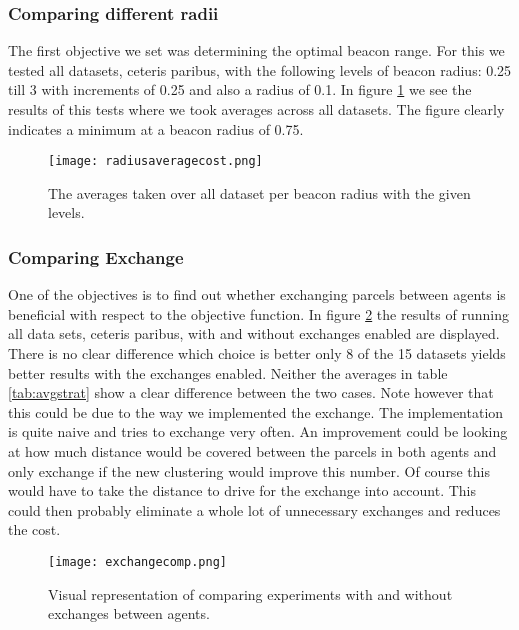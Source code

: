 \documentclass[../main.tex]{subfiles}
\begin{document}
\subsubsection{Comparing different radii}
The first objective we set was determining the optimal beacon range.
For this we tested all datasets, ceteris paribus, with the following levels of beacon radius: 0.25 till 3 with increments of 0.25 and also a radius of 0.1.
In figure \ref{fig:rad} we see the results of this tests where we took averages across all datasets.
The figure clearly indicates a minimum at a beacon radius of 0.75.
\begin{figure}
	\centering
	\texttt{[image: radiusaveragecost.png]}
	\caption{The averages taken over all dataset per beacon radius with the given levels.}
	\label{fig:rad}
\end{figure}

\subsubsection{Comparing Exchange}
One of the objectives is to find out whether exchanging parcels between agents is beneficial with respect to the objective function.
In figure \ref{fig:exch} the results of running all data sets, ceteris paribus, with and without exchanges enabled are displayed.
There is no clear difference which choice is better only 8 of the 15 datasets yields better results with the exchanges enabled.
Neither the averages in table \ref{tab:avgstrat} show a clear difference between the two cases.
Note however that this could be due to the way we implemented the exchange.
The implementation is quite naive and tries to exchange very often.
An improvement could be looking at how much distance would be covered between the parcels in both agents and only exchange if the new clustering would improve this number.
Of course this would have to take the distance to drive for the exchange into account.
This could then probably eliminate a whole lot of unnecessary exchanges and reduces the cost.

\begin{figure}
	\centering
	\texttt{[image: exchangecomp.png]}
	\caption{Visual representation of comparing experiments with and without exchanges between agents.}
	\label{fig:exch}
\end{figure}
\end{document}
